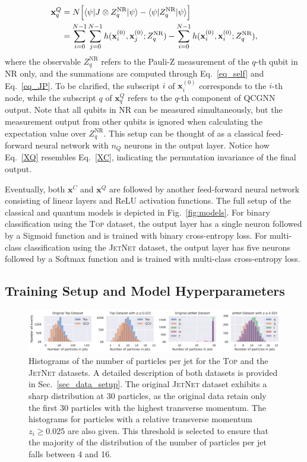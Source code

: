 \documentclass[reprint,amsmath,amssymb,prd,nofootinbib]{revtex4-2}
\def\xbf{\mathbf{x}}
\def\ZNR{Z^\text{NR}}
\newcommand{\Top}{\textsc{Top}\xspace}
\newcommand{\JetNet}{\textsc{JetNet}\xspace}
\begin{document}
\begin{equation} \label{XQ}
    \begin{split}
        \xbf^Q_q &= N \Bigl[ \braket{\psi|J\otimes \ZNR_q|\psi} - \braket{\psi|\ZNR_q|\psi} \Bigr] \\
        &= \sum^{N-1}_{i=0}\sum^{N-1}_{j=0} h(\xbf^{(0)}_i, \xbf^{(0)}_j; \ZNR_q) - \sum^{N-1}_{i=0} h(\xbf^{(0)}_i, \xbf^{(0)}_i; \ZNR_q),
    \end{split}
\end{equation}
where the observable $\ZNR_q$ refers to the Pauli-Z measurement of the $q$-th qubit in NR only, and the summations are computed through Eq.~\ref{eq_self} and Eq.~\ref{eq_JP}. To be clarified, the subscript $i$ of $\xbf^{(0)}_i$ corresponds to the $i$-th node, while the subscript $q$ of $\xbf^Q_q$ refers to the $q$-th component of QCGNN output. Note that all qubits in NR can be measured simultaneously, but the measurement output from other qubits is ignored when calculating the expectation value over $\ZNR_q$. This setup can be thought of as a classical feed-forward neural network with $n_Q$ neurons in the output layer. Notice how Eq.~\ref{XQ} resembles Eq.~\ref{XC}, indicating the permutation invariance of the final output.

Eventually, both $\xbf^C$ and $\xbf^Q$ are followed by another feed-forward neural network consisting of linear layers and ReLU activation functions. The full setup of the classical and quantum models is depicted in Fig.~\ref{fig:models}. For binary classification using the \Top dataset, the output layer has a single neuron followed by a Sigmoid function and is trained with binary cross-entropy loss. For multi-class classification using the \JetNet dataset, the output layer has five neurons followed by a Softmax function and is trained with multi-class cross-entropy loss.

\subsection{Training Setup and Model Hyperparameters} \label{sec_train}

\begin{figure}[htbp]
    \centering
    \includegraphics[width=\textwidth]{fig_ptc_hist.png}
    \caption{Histograms of the number of particles per jet for the \Top and the \JetNet datasets. A detailed description of both datasets is provided in Sec.~\ref{sec_data_setup}. The original \JetNet dataset exhibits a sharp distribution at 30 particles, as the original data retain only the first 30 particles with the highest transverse momentum. The histograms for particles with a relative transverse momentum $z_i \ge 0.025$ are also given. This threshold is selected to ensure that the majority of the distribution of the number of particles per jet falls between 4 and 16.}
    \label{fig:hist}
\end{figure}
\end{document}
